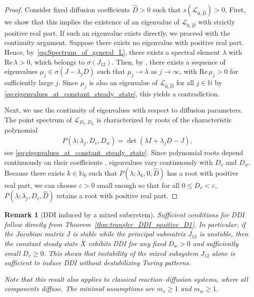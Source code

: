 \documentclass[12pt, a4paper]{amsart}
\numberwithin{equation}{section}
\newcommand{\NN}{\mathbb{N}}
\renewcommand{\Re}{\mathrm{Re}\,}
\newcommand{\CSS}{\bar{X}}
\newcommand{\Ds}{D_v}
\newcommand{\Df}{D_w}
\newcommand{\ms}{m_{v}}  %
\newcommand{\mfa}{m_{w}} %
\renewcommand{\L}{{\mathcal{L}}}
\newtheorem{remark}[theorem]{\bf Remark}
\begin{document}
\begin{proof}
    Consider fixed diffusion coefficients $\hat{D} > 0$ such that $s(\L_{0,\hat{D}}) > 0$.
    First, we show that this implies the existence of an eigenvalue of $\L_{0,\hat{D}}$ with strictly positive real part.
    If such an eigenvalue exists directly, we proceed with the continuity argument.
    Suppose there exists no eigenvalue with positive real part.
    Hence, by~\eqref{eq:Spectrum_of_general_L}, there exists a spectral element $\lambda$ with $\Re \lambda > 0$, which belongs to $\sigma(J_{12})$.
    Then, by \cite[Section 2.1.2]{Klika12}, there exists a sequence of eigenvalues $\mu_j \in \sigma(J - \lambda_j D)$ such that $\mu_j \to \lambda$ as $j \to \infty$, with $\Re \mu_j > 0$ for sufficiently large $j$.
    Since $\mu_j$ is also an eigenvalue of $\L_{0,\hat{D}}$ for all $j\in\NN$ by \eqref{eq:eigenvalues_at_constant_steady_state}, this yields a contradiction.
    
    Next, we use the continuity of eigenvalues with respect to diffusion parameters.
    The point spectrum of $\L_{\Ds, \Df}$ is characterized by roots of the characteristic polynomial
    \begin{align}
        P(\lambda; \lambda_j, \Ds, \Df) = \det(\lambda I + \lambda_j D - J),
    \end{align}
    see \eqref{eq:eigenvalues_at_constant_steady_state}.
    Since polynomial roots depend continuously on their coefficients \cite{CuckerCorbalan}, eigenvalues vary continuously with $\Ds$ and $\Df$.
    Because there exists $k \in \mathbb{N}_0$ such that $P(\lambda; \lambda_k, 0, \hat{D})$ has a root with positive real part, 
    we can choose $\varepsilon > 0$ small enough so that for all $0 \leqslant \Ds < \varepsilon$, $P(\lambda; \lambda_j, \Ds, \hat{D})$ retains a root with positive real part.
\end{proof}

\begin{remark}[DDI induced by a mixed subsystem]
    Sufficient conditions for DDI follow directly from Theorem~\ref{thm:transfer_DDI_positive_D1}. In particular, if the Jacobian matrix $J$ is stable while the principal submatrix $J_{12}$ is unstable, then the constant steady state $\CSS$ exhibits DDI for any fixed $\Df>0$ and sufficiently small $\Ds \geqslant 0$. This shows that instability of the mixed subsystem $J_{12}$ alone is sufficient to induce DDI without destabilizing Turing patterns.

    Note that this result also applies to classical reaction--diffusion systems, where all components diffuse. The minimal assumptions are $\ms \ge 1$ and $\mfa \ge 1$.
\end{remark}
\end{document}
